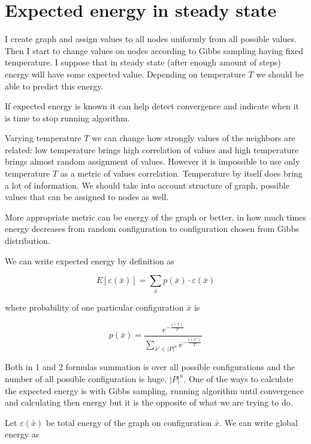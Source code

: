 \documentclass[12pt]{report}
\begin{document}
\section{Expected energy in steady state}

I create graph and assign values to all nodes uniformly from all possible values. Then I start to change values on nodes according to Gibbs sampling having fixed temperature. I suppose that in steady state (after enough amount of steps) energy will have some expected value. Depending on temperature $T$ we should be able to predict this energy.

If expected energy is known it can help detect convergence and indicate when it is time to stop running algorithm. 


Varying temperature $T$ we can change how strongly values of the neighbors are related: low temperature brings high correlation of values and high temperature brings almost random assignment of values. However it is impossible to use only temperature $T$ as a metric of values correlation. Temperature by itself does bring a lot of information. We should take into account structure of graph, possible values that can be assigned to nodes as well. 

More appropriate metric can be energy of the graph or better, in how much times energy decreases from random configuration to configuration chosen from Gibbs distribution. %

We can write expected energy by definition as

$$ E[\varepsilon (\bar{x})] = \sum\limits_{\bar{x}} p(\bar{x}) \cdot \varepsilon(\bar{x})$$

where probability of one particular configuration $\bar{x}$ is  

$$ p(\bar{x}) = \frac{ e^{-\frac{ \varepsilon (\bar{x})}{T}} }{ \sum\limits_{\bar{x}'\in |P|^n} e^{-\frac{\varepsilon(\bar{x}')}{T}}} $$

Both in 1 and 2 formulas summation is over all possible configurations and the number of all possible configuration is huge, $|P|^n$. One of the ways to calculate the expected energy is with Gibbs sampling, running algorithm until convergence and calculating then energy but it is the opposite of what we are trying to do.

Let $ \varepsilon (\bar{x})$ be total energy of the graph on configuration $\bar{x}$. We can write global energy as 
\end{document}
